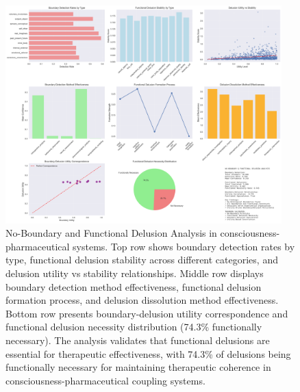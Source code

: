 \begin{figure}[htbp]
\centering
\includegraphics[width=0.95\textwidth]{images/no_boundary_delusion_analysis_20250925_204646.png}
\caption{No-Boundary and Functional Delusion Analysis in consciousness-pharmaceutical systems. Top row shows boundary detection rates by type, functional delusion stability across different categories, and delusion utility vs stability relationships. Middle row displays boundary detection method effectiveness, functional delusion formation process, and delusion dissolution method effectiveness. Bottom row presents boundary-delusion utility correspondence and functional delusion necessity distribution (74.3\% functionally necessary). The analysis validates that functional delusions are essential for therapeutic effectiveness, with 74.3\% of delusions being functionally necessary for maintaining therapeutic coherence in consciousness-pharmaceutical coupling systems.}
\label{fig:no_boundary_delusion}
\end{figure}

